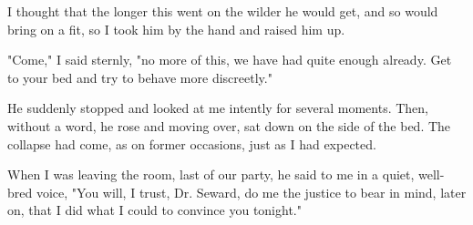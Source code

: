 I thought that the longer this went on the wilder he would get, and so would bring on a fit, so I took him by the hand and raised him up. 

"Come," I said sternly, "no more of this, we have had quite enough already. Get to your bed and try to behave more discreetly." 

He suddenly stopped and looked at me intently for several moments. Then, without a word, he rose and moving over, sat down on the side of the bed. The collapse had come, as on former occasions, just as I had expected. 

When I was leaving the room, last of our party, he said to me in a quiet, well-bred voice, "You will, I trust, Dr. Seward, do me the justice to bear in mind, later on, that I did what I could to convince you tonight." 
